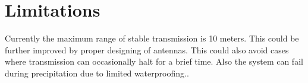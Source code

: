 \newpage
\chapter{Limitations}
Currently the maximum range of stable transmission is 10 meters. This
could be further improved by proper designing of antennas. This could
also avoid cases where transmission can occasionally halt for a brief
time. Also the system can fail during precipitation due to limited
waterproofing..
